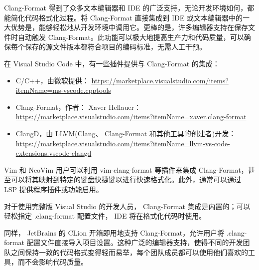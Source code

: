 Clang-Format 得到了众多文本编辑器和 IDE 的广泛支持，无论开发环境如何，都能简化代码格式化过程。将 Clang-Format 直接集成到 IDE 或文本编辑器中的一大优势是，能够轻松地从开发环境中调用它。更棒的是，许多编辑器支持在保存文件时自动触发 Clang-Format。此功能可以极大地提高生产力和代码质量，可以确保每个保存的源文件版本都符合项目的编码标准，无需人工干预。

在 Visual Studio Code 中，有一些插件提供与 Clang-Format 的集成：

\begin{itemize}
\item
C/C++，由微软提供： \url{https://marketplace.visualstudio.com/items?itemName=ms-vscode.cpptools}

\item
Clang-Format，作者： Xaver Hellauer： \url{https://marketplace.visualstudio.com/items?itemName=xaver.clang-format}

\item
ClangD，由 LLVM(Clang、 Clang-Format 和其他工具的创建者)开发： \url{https://marketplace.visualstudio.com/items?itemName=llvm-vs-code-extensions.vscode-clangd}
\end{itemize}

Vim 和 NeoVim 用户可以利用 vim-clang-format 等插件来集成 Clang-Format，甚至可以将其映射到特定的键盘快捷键以进行快速格式化。此外，通常可以通过 LSP 提供程序插件或功能启用。

对于使用完整版 Visual Studio 的开发人员， Clang-Format 集成是内置的；可以轻松指定 .clang-format 配置文件， IDE 将在格式化代码时使用。

同样， JetBrains 的 CLion 开箱即用地支持 Clang-Format，允许用户将 .clang-format 配置文件直接导入项目设置。这种广泛的编辑器支持，使得不同的开发团队之间保持一致的代码格式变得轻而易举，每个团队成员都可以使用他们喜欢的工具，而不会影响代码质量。
















